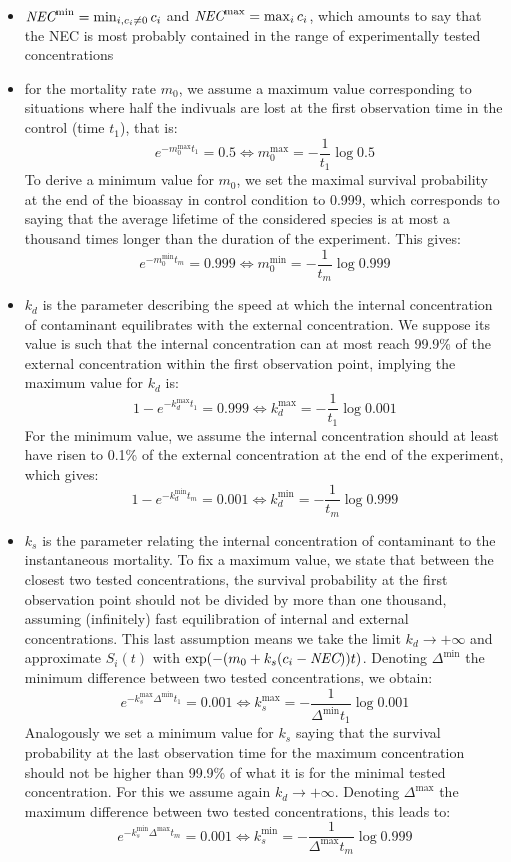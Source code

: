 \documentclass{article}
\begin{document}
\begin{itemize}
\item $\mbox{\it NEC}^{\min} = \min_{i, c_i \neq 0} c_i$  and $\mbox{\it NEC}^{\max} = \max_i c_i$,
  which amounts to say that the NEC is most probably contained in the
  range of experimentally tested concentrations
\item for the mortality rate $m_0$, we assume a maximum value
  corresponding to situations where half the indivuals are lost at the
  first observation time in the control (time $t_1$), that is:
  $$
  e^{- m_0^{\max} t_1} = 0.5 \Leftrightarrow m_0^{\max} = - \frac{1}{t_1} \log 0.5
  $$
  To derive a minimum value for $m_0$, we set the maximal survival
  probability at the end of the bioassay in control condition to
  0.999, which corresponds to saying that the average lifetime of the
  considered species is at most a thousand times longer than the
  duration of the experiment. This gives:
  $$
  e^{- m_0^{\min} t_m} = 0.999 \Leftrightarrow m_0^{\min} = - \frac{1}{t_m} \log 0.999
  $$
\item $k_d$ is the parameter describing the speed at which the
  internal concentration of contaminant equilibrates with the external
  concentration. We suppose its value is such that the internal
  concentration can at most reach 99.9\% of the external concentration
  within the first observation point, implying the maximum value for
  $k_d$ is:
  $$
  1 - e^{- k_d^{\max} t_1} = 0.999 \Leftrightarrow k_d^{\max} = - \frac{1}{t_1} \log 0.001
  $$
  For the minimum value, we assume the internal concentration should
  at least have risen to 0.1\% of the external concentration at the
  end of the experiment, which gives:
  $$
  1 - e^{- k_d^{\min} t_m} = 0.001 \Leftrightarrow k_d^{\min} = - \frac{1}{t_m} \log 0.999
  $$
\item $k_s$ is the parameter relating the internal concentration of
  contaminant to the instantaneous mortality. To fix a maximum value,
  we state that between the closest two tested concentrations, the
  survival probability at the first observation point should not be
  divided by more than one thousand, assuming (infinitely) fast
  equilibration of internal and external concentrations. This last
  assumption means we take the limit $k_d \rightarrow + \infty$ and
  approximate $S_i(t)$ with $\exp(- (m_0 + k_s(c_i -
  \mbox{\it NEC}))t)$. Denoting $\Delta^{\min}$ the minimum difference between
  two tested concentrations, we obtain:
  $$
  e^{- k_s^{\max} \Delta^{\min} t_1} = 0.001 \Leftrightarrow k_s^{\max} = - \frac{1}{\Delta^{\min} t_1} \log 0.001
  $$
  Analogously we set a minimum value for $k_s$ saying that the
  survival probability at the last observation time for the maximum
  concentration should not be higher than 99.9\% of what it is for the
  minimal tested concentration. For this we assume again $k_d
  \rightarrow + \infty$. Denoting $\Delta^{\max}$ the maximum
  difference between two tested concentrations, this leads to:
  $$
  e^{- k_s^{\min} \Delta^{\max} t_m} = 0.001 \Leftrightarrow k_s^{\min} = - \frac{1}{\Delta^{\max} t_m} \log 0.999
  $$
\end{itemize}
\end{document}
